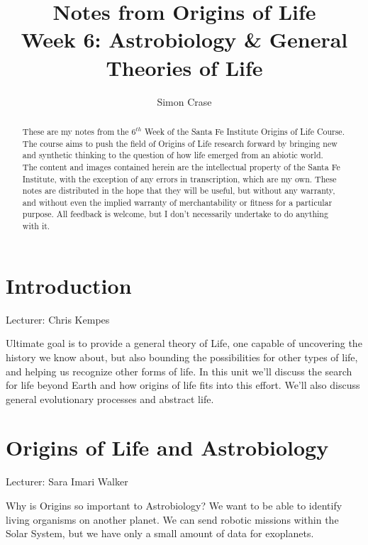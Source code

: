 \documentclass[]{article}
\title{
	Notes from Origins of Life\\
	Week 6: Astrobiology \& General Theories of Life
}
\author{Simon Crase}
\begin{document}
\maketitle

\begin{abstract}
   These are my notes from the $6^{th}$ Week of the Santa Fe Institute Origins of Life Course\cite{sfi2020}. The course aims to push the field of Origins of Life research forward by bringing new and synthetic thinking to the question of how life emerged from an abiotic world.\\
   The content and images contained herein are the intellectual property of the Santa Fe Institute, with the exception of any errors in transcription, which are my own.
   These notes are distributed in the hope that they will be useful,
   but without any warranty, and without even the implied warranty of
   merchantability or fitness for a particular purpose. All feedback is welcome,
   but I don't necessarily undertake to do anything with it.

\end{abstract}

\setcounter{tocdepth}{2}
\tableofcontents

\listoffigures

\section{Introduction}

Lecturer: Chris Kempes

Ultimate goal is to provide a general theory of Life, one capable of uncovering the history we know about, but also bounding the possibilities for other types of life, and helping us recognize other forms of life. In this unit we'll discuss the search for life beyond Earth and how origins of life fits into this effort. We'll also discuss general evolutionary processes and abstract life. 

\section{Origins of Life and Astrobiology}

Lecturer: Sara Imari Walker

Why is Origins so important to Astrobiology? We want to be able to identify living organisms on another planet. We can send robotic missions within the Solar System, but we have only a small amount of data for exoplanets.
\end{document}
